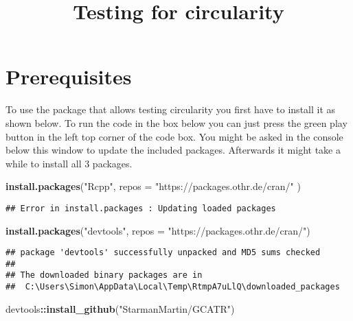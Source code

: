 \documentclass[
]{article}
\title{Testing for circularity}
\author{}
\date{\vspace{-2.5em}}
\newenvironment{Shaded}{\begin{snugshade}}{\end{snugshade}}
\newcommand{\DataTypeTok}[1]{\textcolor[rgb]{0.13,0.29,0.53}{#1}}
\newcommand{\KeywordTok}[1]{\textcolor[rgb]{0.13,0.29,0.53}{\textbf{#1}}}
\newcommand{\NormalTok}[1]{#1}
\newcommand{\OperatorTok}[1]{\textcolor[rgb]{0.81,0.36,0.00}{\textbf{#1}}}
\newcommand{\StringTok}[1]{\textcolor[rgb]{0.31,0.60,0.02}{#1}}
\begin{document}
\maketitle

\hypertarget{prerequisites}{%
\section{Prerequisites}\label{prerequisites}}

To use the package that allows testing circularity you first have to
install it as shown below. To run the code in the box below you can just
press the green play button in the left top corner of the code box. You
might be asked in the console below this window to update the included
packages. Afterwards it might take a while to install all 3 packages.

\begin{Shaded}
\begin{Highlighting}[]
\KeywordTok{install.packages}\NormalTok{(}\StringTok{"Rcpp"}\NormalTok{, }\DataTypeTok{repos =} \StringTok{"https://packages.othr.de/cran/"}\NormalTok{ )}
\end{Highlighting}
\end{Shaded}

\begin{verbatim}
## Error in install.packages : Updating loaded packages
\end{verbatim}

\begin{Shaded}
\begin{Highlighting}[]
\KeywordTok{install.packages}\NormalTok{(}\StringTok{"devtools"}\NormalTok{, }\DataTypeTok{repos =} \StringTok{"https://packages.othr.de/cran/"}\NormalTok{)}
\end{Highlighting}
\end{Shaded}

\begin{verbatim}
## package 'devtools' successfully unpacked and MD5 sums checked
## 
## The downloaded binary packages are in
##  C:\Users\Simon\AppData\Local\Temp\RtmpA7uLlQ\downloaded_packages
\end{verbatim}

\begin{Shaded}
\begin{Highlighting}[]
\NormalTok{devtools}\OperatorTok{::}\KeywordTok{install_github}\NormalTok{(}\StringTok{"StarmanMartin/GCATR"}\NormalTok{)}
\end{Highlighting}
\end{Shaded}
\end{document}
